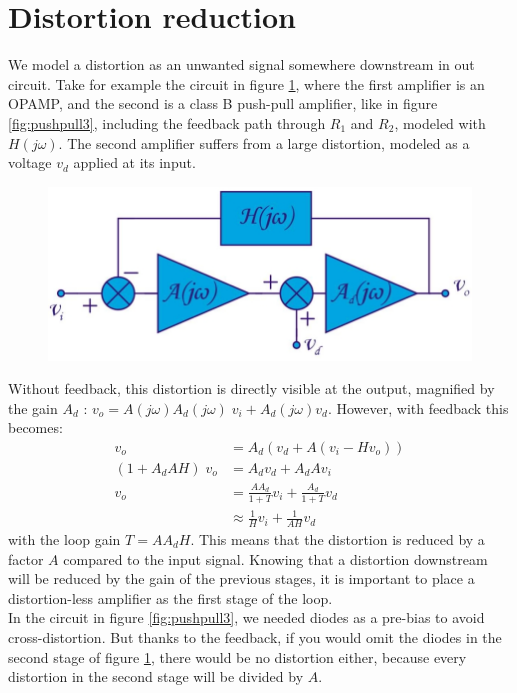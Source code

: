 \section{Distortion reduction}
We model a distortion as an unwanted signal somewhere downstream in out circuit. Take for example the circuit in figure \ref{fig:feedback6}, where the first amplifier is an OPAMP, and the second is a class B push-pull amplifier, like in figure \ref{fig:pushpull3}, including the feedback path through $R_1$ and $R_2$, modeled with $H(j\omega)$. The second amplifier suffers from a large distortion, modeled as a voltage $v_d$ applied at its input.
\begin{figure}[h!]
	\centering
	\includegraphics[width=12cm]{figures/ch10/feedback6.jpg}
	\caption{}
	\label{fig:feedback6}
\end{figure}
Without feedback, this distortion is directly visible at the output, magnified by the gain $A_d$ : $v_o = A(j\omega) A_d(j\omega) \; v_i + A_d(j\omega) v_d$. However, with feedback this becomes:
\begin{align*}
	v_o &= A_d(v_d + A(v_i - H v_o))\\
	(1 + A_dAH)\; v_o &= A_d v_d + A_d A v_i \\
	v_o &= \frac{AA_d}{1 + T} v_i + \frac{A_d}{1 + T} v_d \\
		&\approx \frac{1}{H} v_i + \frac{1}{AH} v_d
\end{align*} 
with the loop gain $T = A A_d H$. This means that the distortion is reduced by a factor $A$ compared to the input signal. Knowing that a distortion downstream will be reduced by the gain of the previous stages, it is important to place a distortion-less amplifier as the first stage of the loop.\\
In the circuit in figure \ref{fig:pushpull3}, we needed diodes as a pre-bias to avoid cross-distortion. But thanks to the feedback, if you would omit the diodes in the second stage of figure \ref{fig:feedback6}, there would be no distortion either, because every distortion in the second stage will be divided by $A$.


